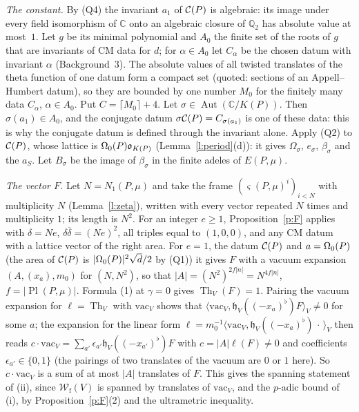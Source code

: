 \documentclass[11pt,a4paper]{article}
\makeatletter
\newcommand{\Q}{\mathbb{Q}}
\theoremstyle{plainx}
\theoremstyle{uprightx}
\renewenvironment{proof}[1][Proof]{\par\pushQED{\qed}\normalfont\topsep0pt\partopsep0pt
  \trivlist\item[\hskip\labelsep\itshape #1.]\ignorespaces}{\popQED\endtrivlist\@endpefalse}
\newcommand{\CC}{\mathbb{C}}
\newcommand{\cj}[1]{\overline{#1}}
\newcommand{\Aut}{\operatorname{Aut}}
\newcommand{\OO}{\mathfrak{o}}
\newcommand{\KP}[1]{K(#1)}
\newcommand{\EP}[2]{E(#1,#2)}
\newcommand{\Nn}[2]{N_1(#1,#2)}
\newcommand{\PlP}[2]{\operatorname{Pl}(#1,#2)}
\newcommand{\rtu}[2]{\varsigma(#1,#2)}
\newcommand{\Wf}[1]{\mathcal{W}_{\mathrm{f}}(#1)}
\newcommand{\vac}[1]{\mathrm{vac}_{#1}}
\newcommand{\heis}[2]{\mathfrak{h}_{#1}(#2)}
\newcommand{\fv}[1]{#1^{\flat}}
\newcommand{\Th}[1]{\operatorname{Th}_{#1}}
\newcommand{\inn}[3]{\langle #2,#3\rangle_{#1}}
\makeatother
\begin{document}
\begin{proof}
\emph{The constant.} By (Q4) the invariant $a_1$ of $\mathcal{C}(P)$ is algebraic: its image under every field
isomorphism of $\CC$ onto an algebraic closure of $\Q_2$ has absolute value at most~$1$. Let $g$ be its minimal
polynomial and $A_0$ the finite set of the roots of $g$ that are invariants of CM data for $d$; for
$\alpha\in A_0$ let $C_\alpha$ be the chosen datum with invariant $\alpha$ (Background~3). The absolute values of
all twisted translates of the theta function of one datum form a compact set (quoted: sections of an
Appell--Humbert datum), so they are bounded by one number $M_0$ for the finitely many data $C_\alpha$,
$\alpha\in A_0$. Put $C=\lceil M_0\rceil+4$. Let $\sigma\in\Aut(\CC/\KP{P})$. Then $\sigma(a_1)\in A_0$, and
the conjugate datum $\sigma\mathcal{C}(P)=C_{\sigma(a_1)}$ is one of these data: this is why the conjugate datum
is defined through the invariant alone. Apply (Q2) to $\mathcal{C}(P)$, whose lattice is $\Omz{P}\OO_{\KP{P}}$
(Lemma~\ref{l:period}(d)): it gives $\Omega_\sigma$, $e_\sigma$, $\beta_\sigma$ and the $a_S$. Let $B_\sigma$ be the
image of $\beta_\sigma$ in the finite adeles of $\EP{P}{\mu}$.

\emph{The vector $F$.} Let $N=\Nn{P}{\mu}$ and take the frame $(\rtu{P}{\mu}^i)_{i<N}$ with multiplicity $N$
(Lemma~\ref{l:zeta}), written with every vector repeated $N$ times and multiplicity $1$; its length is $N^2$. For
an integer $e\ge1$, Proposition~\ref{p:F} applies with $\delta=Ne$, $\delta\cj\delta=(Ne)^2$, all triples equal to
$(1,0,0)$, and any CM datum with a lattice vector of the right area. For $e=1$, the datum $\mathcal{C}(P)$ and
$a=\Omega_0(P)$ (the area of $\mathcal{C}(P)$ is $|\Omega_0(P)|^2\sqrt d/2$ by (Q1)) it gives $F$ with a vacuum expansion
$(A,(x_a),m_0)$ for $(N,N^2)$, so that $|A|=(N^2)^{2f|n|}=N^{4f|n|}$, $f=|\PlP{P}{\mu}|$. Formula (1) at $\gamma=0$ gives $\Th{V}(F)=1$. Pairing the
vacuum expansion for $\ell=\Th{V}$ with $\vac{V}$ shows that
$\inn{V}{\vac{V}}{\heis{V}{\fv{(-x_a)}}F}\ne0$ for some $a$; the expansion for the linear form
$\ell=m_0^{-1}\inn{V}{\vac{V}}{\heis{V}{\fv{(-x_a)}}\,\cdot\,}$ then reads $c\cdot\vac{V}=\sum_{a'}\epsilon_{a'}\heis{V}{\fv{(-x_{a'})}}F$
with $c=|A|\ell(F)\ne0$ and coefficients $\epsilon_{a'}\in\{0,1\}$ (the pairings of two translates of the vacuum are
$0$ or $1$ here). So $c\cdot\vac{V}$ is a sum of at most $|A|$ translates of $F$. This gives the spanning statement of
(ii), since $\Wf{V}$ is spanned by translates of $\vac{V}$, and the $p$-adic bound of (i), by
Proposition~\ref{p:F}(2) and the ultrametric inequality.


\end{proof}
\end{document}
